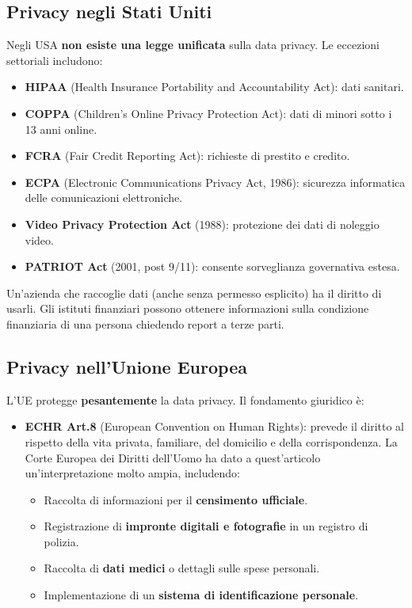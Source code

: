 \documentclass[a4paper,11pt]{article}
\begin{document}
\subsection{Privacy negli Stati Uniti}

Negli USA \textbf{non esiste una legge unificata} sulla data privacy. Le eccezioni settoriali includono:
\begin{itemize}
  \item \textbf{HIPAA} (Health Insurance Portability and Accountability Act): dati sanitari.
  \item \textbf{COPPA} (Children's Online Privacy Protection Act): dati di minori sotto i 13 anni online.
  \item \textbf{FCRA} (Fair Credit Reporting Act): richieste di prestito e credito.
  \item \textbf{ECPA} (Electronic Communications Privacy Act, 1986): sicurezza informatica delle comunicazioni elettroniche.
  \item \textbf{Video Privacy Protection Act} (1988): protezione dei dati di noleggio video.
  \item \textbf{PATRIOT Act} (2001, post 9/11): consente sorveglianza governativa estesa.
\end{itemize}

Un'azienda che raccoglie dati (anche senza permesso esplicito) ha il diritto di usarli. Gli istituti finanziari possono ottenere informazioni sulla condizione finanziaria di una persona chiedendo report a terze parti.

\subsection{Privacy nell'Unione Europea}

L'UE protegge \textbf{pesantemente} la data privacy. Il fondamento giuridico \`{e}:
\begin{itemize}
  \item \textbf{ECHR Art.8} (European Convention on Human Rights): prevede il diritto al rispetto della vita privata, familiare, del domicilio e della corrispondenza.
  La Corte Europea dei Diritti dell'Uomo ha dato a quest'articolo un'interpretazione molto ampia, includendo:
  \begin{itemize}
    \item Raccolta di informazioni per il \textbf{censimento ufficiale}.
    \item Registrazione di \textbf{impronte digitali e fotografie} in un registro di polizia.
    \item Raccolta di \textbf{dati medici} o dettagli sulle spese personali.
    \item Implementazione di un \textbf{sistema di identificazione personale}.
  \end{itemize}
\end{itemize}
\end{document}
